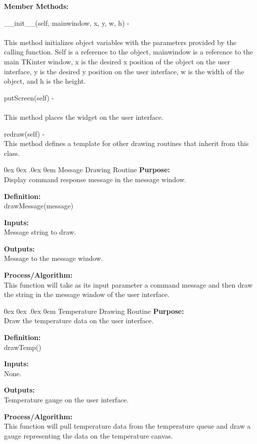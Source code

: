 \documentclass[10pt,draftclsnofoot,onecolumn,compsoc]{IEEEtran}
\makeatletter
\renewcommand\paragraph{\@startsection{paragraph}{4}{\z@}%
                                    {0ex \@plus0ex \@minus.0ex}%
                                    {0em}%
                                    {\normalfont\normalsize\bfseries}}
\makeatother
\begin{document}
{\bf Member Methods:} \par

 \_\_init\_\_(self, mainwindow, x, y, w, h) - \\ \\
This method initializes object variables with the parameters provided by the calling function. Self is a reference to the object, mainwindow is a reference to the main TKinter window, x is the desired x position of the object on the user interface, y is the desired y position on the user interface, w is the width of the object, and h is the height. \par

putScreen(self) - \\ \\
This method places the widget on the user interface. \par

redraw(self) - \\
This method defines a template for other drawing routines that inherit from this class.


\paragraph{Message Drawing Routine}
{\bf Purpose:} \\
Display command response message in the message window.  \par
{\bf Definition:} \\ 
drawMessage(message) \par
{\bf Inputs:} \\ Message string to draw.\par
{\bf Outputs:} \\Message to the message window. \par
{\bf Process/Algorithm:} \\
This function will take as its input parameter a command message and then draw the string in the message window of the user interface. \par

\paragraph{Temperature Drawing Routine}
{\bf Purpose:} \\
Draw the temperature data on the user interface.  \par
{\bf Definition:} \\ 
drawTemp() \par
{\bf Inputs:} \\None. \par
{\bf Outputs:} \\Temperature gauge on the user interface.\par
{\bf Process/Algorithm:} \\
This function will pull temperature data from the temperature queue and draw a gauge representing the data on the temperature canvas. \par
\end{document}
